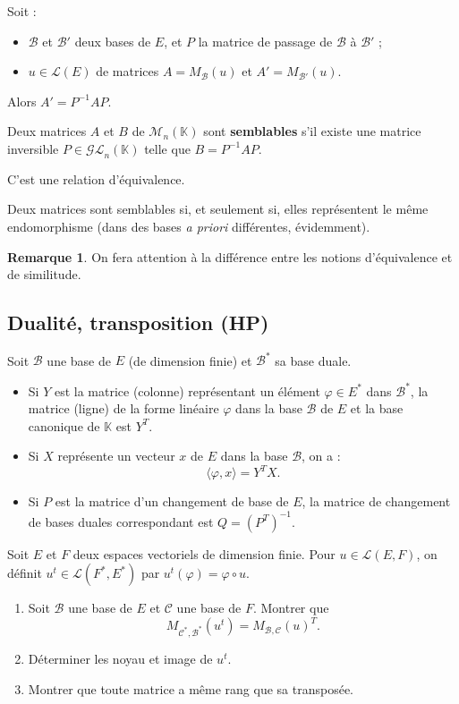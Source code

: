 \documentclass[french]{article}
\newcommand{\K}{\mathbb{K}}
\newcommand{\st}{^*}
\newcommand{\inv}{^{-1}}
\theoremstyle{plain}
\theoremstyle{definition}
\newtheorem*{rmq}{Remarque}
\theoremstyle{remark}
\begin{document}
Soit :
\begin{itemize}
	\item $\mathcal{B}$ et $\mathcal{B}'$ deux bases de $E$, et $P$ la matrice de passage de $\mathcal{B}$ à $\mathcal{B}'$ ;
	\item $u\in\mathcal{L}(E)$ de matrices $A=M_\mathcal{B}(u)$ et $A'=M_{\mathcal{B}'}(u)$.
\end{itemize}
Alors $A'=P\inv AP$.

\begin{dfn}
	Deux matrices $A$ et $B$ de $\mathcal{M}_n(\K)$ sont \textbf{semblables} s'il existe une matrice inversible $P\in\mathcal{GL}_n(\K)$ telle que $B=P\inv AP$.
\end{dfn}

C'est une relation d'équivalence.

\begin{prop}%
	Deux matrices sont semblables si, et seulement si, elles représentent le même endomorphisme (dans des bases \textit{a priori} différentes, évidemment).
\end{prop}

\begin{rmq}
	On fera attention à la différence entre les notions d'équivalence et de similitude.
\end{rmq}

\subsection{Dualité, transposition (HP)}

Soit $\mathcal{B}$ une base de $E$ (de dimension finie) et $\mathcal{B}\st$ sa base duale.
\begin{itemize}
	\item Si $Y$ est la matrice (colonne) représentant un élément $\varphi\in E\st$ dans $\mathcal{B}\st$, la matrice (ligne) de la forme linéaire $\varphi$ dans la base $\mathcal{B}$ de $E$ et la base canonique de $\K$ est $Y^T$.
	\item Si $X$ représente un vecteur $x$ de $E$ dans la base $\mathcal{B}$, on a :
	$$\langle\varphi,x\rangle=Y^TX.$$
	\item Si $P$ est la matrice d'un changement de base de $E$, la matrice de changement de bases duales correspondant est $Q=(P^T)\inv$.
\end{itemize}

\begin{exo}[$\star$]
	Soit $E$ et $F$ deux espaces vectoriels de dimension finie. Pour $u\in\mathcal{L}(E,F)$, on définit $u^t\in\mathcal{L}(F\st,E\st)$ par $u^t(\varphi)=\varphi\circ u$.
	\begin{enumerate}
		\item Soit $\mathcal{B}$ une base de $E$ et $\mathcal{C}$ une base de $F$. Montrer que 
		$$M_{\mathcal{C}\st,\mathcal{B}\st}(u^t)=M_{\mathcal{B},\mathcal{C}}(u)^T.$$
		\item Déterminer les noyau et image de $u^t$.
		\item Montrer que toute matrice a même rang que sa transposée.
	\end{enumerate}
\end{exo}
\end{document}
